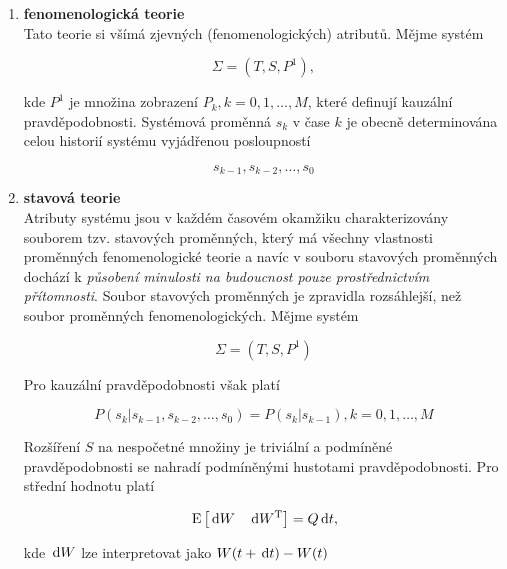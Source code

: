 \begin{enumerate}[label=\alph*)]
\item \textbf{fenomenologická teorie}\\
Tato teorie si všímá zjevných (fenomenologických) atributů. Mějme systém

\[ \Sigma = (T,S,P^1), \]

kde $P^1$ je množina zobrazení $P_k, k=0,1,\ldots, M$, které definují kauzální pravděpodobnosti. Systémová proměnná $s_k$ v čase $k$ je obecně determinována celou historií systému vyjádřenou posloupností

\[ s_{k-1},s_{k-2},\ldots,s_0 \]

\item \textbf{stavová teorie}\\
Atributy systému jsou v každém časovém okamžiku charakterizovány souborem tzv. stavových proměnných, který má všechny vlastnosti proměnných fenomenologické teorie a navíc v souboru stavových proměnných dochází k \textit{působení minulosti na budoucnost pouze prostřednictvím přítomnosti}. Soubor stavových proměnných je zpravidla rozsáhlejší, než soubor proměnných fenomenologických. Mějme systém

\[ \Sigma = (T,S,P^1) \]

Pro kauzální pravděpodobnosti však platí

\[ P(s_k|s_{k-1},s_{k-2},\ldots,s_0) = P(s_k|s_{k-1}), k =0,1,\ldots,M \]

Rozšíření $S$ na nespočetné množiny je triviální a podmíněné pravděpodobnosti se nahradí podmíněnými hustotami pravděpodobnosti. Pro střední hodnotu platí

\[ \,\mathrm{E}\left[\,\mathrm{d} W\quad \,\mathrm{d} W^{\mathrm{T}}\right] = Q\,\mathrm{d} t, \]

kde $\,\mathrm{d} W$ lze interpretovat jako $W(t+\,\mathrm{d} t) - W(t)$
\end{enumerate}

